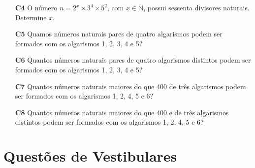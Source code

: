 \documentclass[a4paper,12pt]{article}
\begin{document}
\begin{enumerate}
\item[\textbf{C4}] O número $n = 2^x \times 3^4 \times 5^2 \textrm{, com } x \in \mathbb{N}$, possui sessenta divisores naturais. Determine $x$. 

\item[\textbf{C5}] Quamos números naturais pares de quatro algarismos podem ser formados com os algarismos 1, 2, 3, 4 e 5? 

\item[\textbf{C6}] Quantos números naturais pares de quatro algarismos distintos podem ser formados com os algarismos 1, 2, 3, 4 e 5?

\item[\textbf{C7}] Quantos números naturais maiores do que 400 de três algarismos podem ser formados com os algarismos 1, 2, 4, 5 e 6?

\item[\textbf{C8}] Quantos números naturais maiores do que 400 e de três algarismos distintos podem ser formados com os algarismos 1, 2, 4, 5 e 6? 

\end{enumerate}

\section{Questões de Vestibulares}
\end{document}
